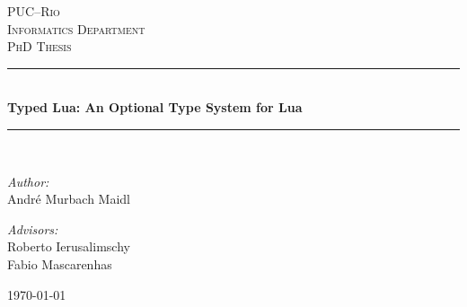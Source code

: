 \documentclass[pdftex,12pt,a4paper]{report}
\begin{document}
\begin{titlepage}
\begin{center}

\textsc{\LARGE PUC--Rio}\\[1.5cm]
\textsc{\Large Informatics Department}\\[1.0cm]
\textsc{\Large PhD Thesis}\\[0.5cm]

\newcommand{\HRule}{\rule{\linewidth}{0.5mm}}
\HRule \\[0.4cm]
{\huge \bfseries Typed Lua: An Optional Type System for Lua}\\[0.4cm]
\HRule \\[1.5cm]

\begin{minipage}{0.4\textwidth}
\begin{flushleft} \large
\emph{Author:}\\
André Murbach Maidl
\end{flushleft}
\end{minipage}
\begin{minipage}{0.4\textwidth}
\begin{flushright} \large
\emph{Advisors:} \\
Roberto Ierusalimschy \\
Fabio Mascarenhas
\end{flushright}
\end{minipage}

\vfill
{\large \today}

\end{center}
\end{titlepage}

\newpage
{}

\tableofcontents

\listoffigures
{}




\newpage
{}
\end{document}
